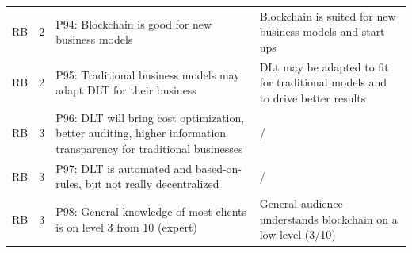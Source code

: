 \begin{table}[H]
\begin{tabularx}{\textwidth}{ll|X|p{4.5cm}}
	RB & 2 & P94: Blockchain is good for new business models & Blockchain is suited for new business models and start ups   \\  
	RB & 2 & P95: Traditional business models may adapt DLT for their business & DLt may be adapted to fit for traditional models and to drive better results   \\  
	RB & 3 & P96: DLT will bring cost optimization, better auditing, higher information transparency for traditional businesses & / \\
	RB & 3 & P97: DLT is automated and based-on-rules, but not really decentralized & /   \\  
	RB & 3 & P98: General knowledge of most clients is on level 3 from 10 (expert) & General audience understands blockchain on a low level (3/10)   \\  
	\end{tabularx}
\end{table}

